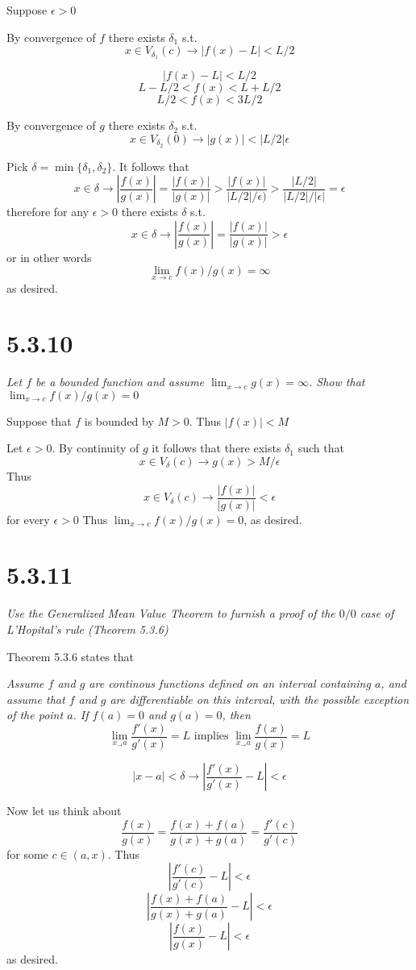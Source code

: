 \documentclass[11pt,oneside,titlepage]{book}
\begin{document}
Suppose $\epsilon > 0$

By convergence of $f$ there exists 
$\delta_1$ s.t.
$$x \in V_{\delta_1}(c) \to |f(x) - L| < L/2$$

$$|f(x) - L| < L/2$$
$$L - L/2 < f(x) < L + L/2$$
$$L/2 < f(x) < 3L/2$$

By convergence of $g$ there exists 
$\delta_2$ s.t.
$$x \in V_{\delta_2}(0) \to |g(x) | < |L/2|\epsilon$$

Pick $\delta = \min\{\delta_1, \delta_2\}$. It follows that 
$$x \in \delta \to |\frac{f(x)}{g(x)}| = \frac{|f(x)|}{|g(x)|} >
\frac{|f(x)|}{|L/2|/\epsilon)} > \frac{|L/2|}{ |L/2|/|\epsilon|} = \epsilon$$
therefore for any $\epsilon > 0$ there exists  $\delta$ s.t.
$$x \in \delta \to |\frac{f(x)}{g(x)}| = \frac{|f(x)|}{|g(x)|} > \epsilon$$
or in other words
$$\lim_{x \to c}{f(x)/g(x)} = \infty$$
as desired.

\section*{5.3.10}
\textit{Let $f$ be a bounded function and assume $\lim_{x \to c}g(x) = \infty$.
  Show that $\lim_{x \to c}f(x)/g(x) = 0$
}

Suppose that $f$ is bounded by $M > 0$. Thus $|f(x)| < M$

Let $\epsilon > 0$. By continuity of $g$ it follows that there exists
$\delta_1$ such that
$$x \in V_\delta(c) \to g(x) > M/\epsilon$$
Thus
$$x \in V_\delta(c) \to \frac{|f(x)|}{|g(x)|} < \epsilon$$
for every $\epsilon > 0$
Thus $\lim_{x \to c}f(x)/g(x) = 0$, as desired.

\section*{5.3.11}
\textit{Use the Generalized Mean Value Theorem to furnish a proof of the
  $0/0$ case of L'Hopital's rule (Theorem 5.3.6)}

Theorem 5.3.6 states that

\textit{Assume $f$ and $g$ are continous functions defined on an interval
  containing $a$, and assume that $f$ and $g$ are differentiable on this
  interval, with the possible exception of the point $a$. If $f(a) = 0$ and
  $g(a) = 0$, then }
$$\lim_{x_\to a}\frac{f'(x)}{g'(x)} = L \text{ implies }
\lim_{x_\to a}\frac{f(x)}{g(x)} = L$$

$$|x - a| < \delta \to \left|\frac{f'(x)}{g'(x)} - L\right| < \epsilon$$

Now let us think about
$$\frac{f(x)}{g(x)} = \frac{f(x) + f(a)}{g(x) + g(a)} = \frac{f'(c)}{g'(c)}$$
for some $c \in (a, x)$. Thus
$$\left|\frac{f'(c)}{g'(c)} - L\right| < \epsilon$$
$$\left|\frac{f(x) + f(a)}{g(x) + g(a)} - L\right|  < \epsilon$$
$$\left|\frac{f(x) }{g(x) } - L\right|  < \epsilon$$
as desired.
\end{document}
